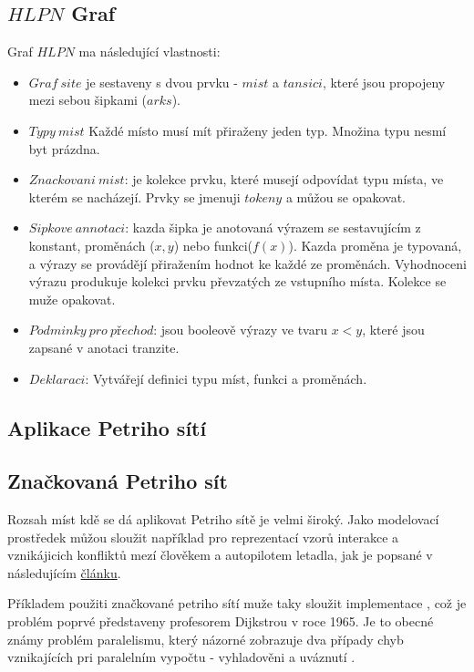 \subsection{$HLPN$ Graf}
Graf $HLPN$ ma následující vlastnosti:
\begin{itemize}
  \item $Graf\:site$ je sestaveny s dvou prvku - $mist$ a $tansici$, které jsou propojeny mezi sebou šipkami ($arks$).
  \item $Typy\:mist$ Každé místo musí mít přiraženy jeden typ. Množina typu nesmí byt prázdna.
  \item $Znackovani\:mist$: je kolekce prvku, které musejí odpovídat typu místa, ve kterém se nacházejí. Prvky se jmenuji $tokeny$ a můžou se opakovat.
  \item $Sipkove\:annotaci$: kazda šipka je anotovaná výrazem se sestavujícím z konstant, proměnách ($x, y$) nebo funkci($f(x)$). Kazda proměna je typovaná, a výrazy se provádějí přiražením hodnot ke každé ze proměnách. Vyhodnoceni výrazu produkuje kolekci prvku převzatých ze vstupního místa. Kolekce se muže opakovat.
  \item $Podminky\:pro\:přechod$: jsou booleově výrazy ve tvaru $x < y$, které jsou zapsané v anotaci tranzite.
  \item $Deklaraci$: Vytvářejí definici typu míst, funkci a proměnách.
\end{itemize}

\subsection{Aplikace Petriho sítí}

\subsection{Značkovaná Petriho sít}
Rozsah míst kdě se dá aplikovat Petriho sítě je velmi široký. Jako modelovací prostředek můžou sloužit například pro reprezentací vzorů interakce a vznikájicich konfliktů mezí člověkem a autopilotem letadla, jak je popsané v následujícím \href{https://www-tandfonline-com.ezproxy.lib.vutbr.cz/doi/full/10.1080/00140139.2013.877597}{článku}.

Příkladem použiti značkované petriho sítí muže taky sloužit implementace  \cite[p.65--67]{PNandMoS}, což je problém poprvé představeny profesorem Dijkstrou v roce 1965.
Je to obecné známy problém paralelismu, který názorné zobrazuje dva případy chyb vznikajících pri paralelním vypočtu - vyhladověni a uváznutí \cite{dining_philosophers}.

